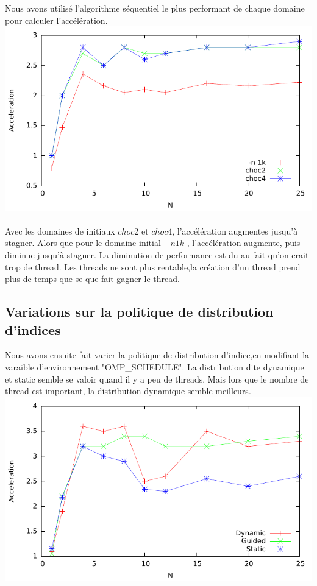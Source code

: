 \documentclass[a4paper,11pt]{report}
\begin{document}
Nous avons utilisé l'algorithme séquentiel le plus performant de chaque domaine pour calculer l'accélération.\\

\includegraphics{Courbe/Difference_domain_initial.pdf}\\

\paragraph{}
Avec les domaines de initiaux $choc2$ et $choc4$, l'accélération augmentes jusqu'à stagner. Alors que pour le domaine initial $-n 1k$ , l'accélération augmente, puis diminue jusqu'à stagner. La diminution de performance est du au fait qu'on crait trop de thread. Les threads ne sont plus rentable,la création d'un thread prend plus de temps que se que fait gagner le thread.

\subsection{Variations sur la politique de distribution d'indices}
Nous avons ensuite fait varier la politique de distribution d'indice,en modifiant la varaible d'environnement "OMP\_SCHEDULE". La distribution dite dynamique et static semble se valoir quand il y a peu de threads. Mais lors que le nombre de thread est important, la distribution dynamique semble meilleurs.\\

\includegraphics{Courbe/sch.pdf}
\end{document}
